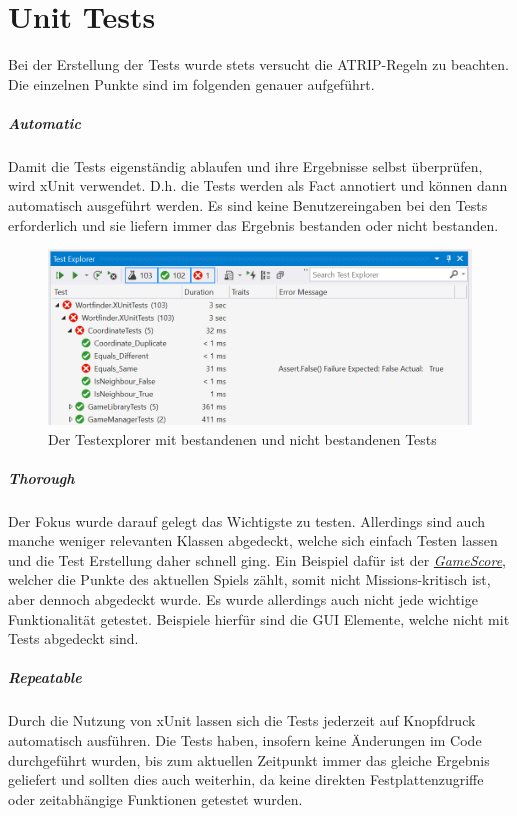\chapter{Unit Tests}

Bei der Erstellung der Tests wurde stets versucht die ATRIP-Regeln zu beachten. Die einzelnen Punkte sind im folgenden genauer aufgeführt.

\paragraph{Automatic}
Damit die Tests eigenständig ablaufen und ihre Ergebnisse selbst überprüfen, wird xUnit verwendet. D.h. die Tests werden als \glqq Fact\grqq{} annotiert und können dann automatisch ausgeführt werden. Es sind keine Benutzereingaben bei den Tests erforderlich und sie liefern immer das Ergebnis \glqq bestanden\grqq{} oder \glqq nicht bestanden\grqq{}.

\begin{figure}[htb]
\centering
\includegraphics[width=.7\textwidth]{Bilder/TestExplorer.PNG}
\caption{\label{Abb:TestExplorer}Der Testexplorer mit bestandenen und nicht bestandenen Tests}
\end{figure}

\paragraph{Thorough}
Der Fokus wurde darauf gelegt das Wichtigste zu testen. Allerdings sind auch manche weniger relevanten Klassen abgedeckt, welche sich einfach Testen lassen und die Test Erstellung daher schnell ging. Ein Beispiel dafür ist der \href{https://github.com/EinToni/Wortfinder/blob/main/Wortfinder/GameScore.cs}{\textit{GameScore}}, welcher die Punkte des aktuellen Spiels zählt, somit nicht Missions-kritisch ist, aber dennoch abgedeckt wurde. Es wurde allerdings auch nicht jede wichtige Funktionalität getestet. Beispiele hierfür sind die GUI Elemente, welche nicht mit Tests abgedeckt sind.

\paragraph{Repeatable}
Durch die Nutzung von xUnit lassen sich die Tests jederzeit auf Knopfdruck automatisch ausführen. Die Tests haben, insofern keine Änderungen im Code durchgeführt wurden, bis zum aktuellen Zeitpunkt immer das gleiche Ergebnis geliefert und sollten dies auch weiterhin, da keine direkten Festplattenzugriffe oder zeitabhängige Funktionen getestet wurden.

